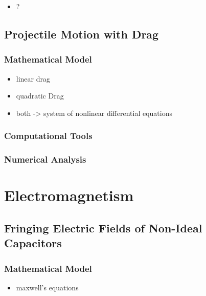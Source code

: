 \documentclass{report}
\begin{document}
            \begin{itemize}
                \item ?
            \end{itemize}

    \subsection{Projectile Motion with Drag}

        \subsubsection{Mathematical Model}

            \begin{itemize}
                \item linear drag
                \item quadratic Drag
                \item both -> system of nonlinear differential equations
            \end{itemize}

        \subsubsection{Computational Tools}

        \subsubsection{Numerical Analysis}

\section{Electromagnetism}

    \subsection{Fringing Electric Fields of Non-Ideal Capacitors}

        \subsubsection{Mathematical Model}

            \begin{itemize}
                \item maxwell's equations
            \end{itemize}
\end{document}
